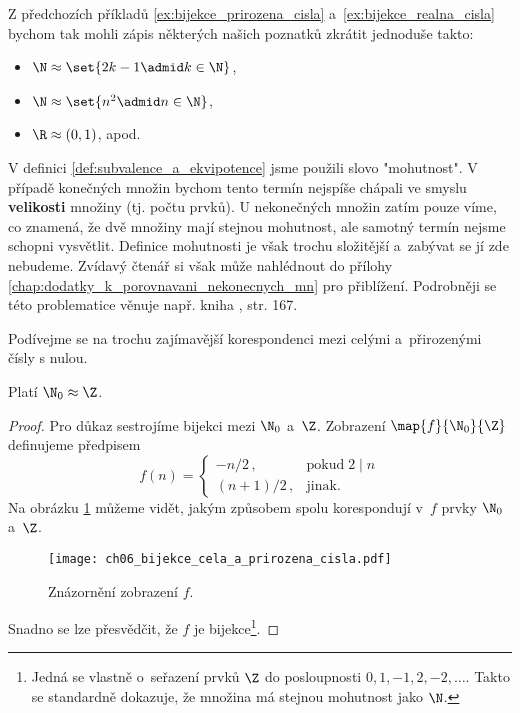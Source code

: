 Z předchozích příkladů \ref{ex:bijekce_prirozena_cisla} a~\ref{ex:bijekce_realna_cisla} bychom tak mohli zápis některých našich poznatků zkrátit jednoduše takto:
\begin{itemize}
    \item $\N\approx\set{2k-1\admid k\in\N}$,
    \item $\N\approx\set{n^2\admid n\in\N}$,
    \item $\R\approx(0,1)$, apod.
\end{itemize}
V definici \ref{def:subvalence_a_ekvipotence} jsme použili slovo "mohutnost". V případě konečných množin bychom tento termín nejspíše chápali ve smyslu \textbf{velikosti} množiny (tj. počtu prvků). U nekonečných množin zatím pouze víme, co znamená, že dvě množiny mají stejnou mohutnost, ale samotný termín nejsme schopni vysvětlit. Definice mohutnosti je však trochu složitější a~zabývat se jí zde nebudeme. Zvídavý čtenář si však může nahlédnout do přílohy \ref{chap:dodatky_k_porovnavani_nekonecnych_mn} pro přiblížení. Podrobněji se této problematice věnuje např. kniha \cite{Potter2009}, str. 167.\par
Podívejme se na trochu zajímavější korespondenci mezi celými a~přirozenými čísly s nulou.
\begin{theorem}\label{thm:N_a_Z}
    Platí $\N_0\approx\Z$.
\end{theorem}
\begin{proof}
    Pro důkaz sestrojíme bijekci mezi $\N_0$ a~$\Z$. Zobrazení $\map{f}{\N_0}{\Z}$ definujeme předpisem
    \begin{equation*}
        f(n)=\left\{
        \begin{array}{ll}
            -n/2\,, & \text{pokud}\;2\mid n\\
            (n+1)/2\,, & \text{jinak}.
        \end{array}
        \right.
    \end{equation*}
    Na obrázku \ref{fig:bijekce_cela_a_prirozena_cisla} můžeme vidět, jakým způsobem spolu korespondují v~$f$ prvky $\N_0$ a~$\Z$.
    \begin{figure}[H]
        \centering
        \texttt{[image: ch06\_bijekce\_cela\_a\_prirozena\_cisla.pdf]}
        \caption{Znázornění zobrazení $f$.}
        \label{fig:bijekce_cela_a_prirozena_cisla}
    \end{figure}
    Snadno se lze přesvědčit, že $f$ je bijekce\footnote{Jedná se vlastně o~seřazení prvků $\Z$ do posloupnosti $0,1,-1,2,-2,\dots$. Takto se standardně dokazuje, že množina má stejnou mohutnost jako $\N$.}.
\end{proof}
